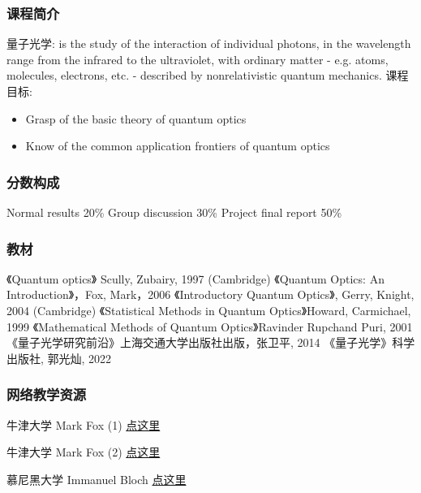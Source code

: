 \begin{frame}
    \frametitle{课程简介}
    \begin{enumerate}
        \Item 量子光学: is the study of the interaction of individual photons, in the wavelength range from the infrared to the ultraviolet, with ordinary matter - e.g. atoms, molecules, electrons, etc. - described by nonrelativistic quantum mechanics. 
        \Item 课程目标:       
        \begin{itemize}
          \item Grasp of the basic theory of quantum optics
          \item Know of the common application frontiers of quantum optics
      \end{itemize}
    \end{enumerate}
\end{frame}

\begin{frame} 
  \frametitle{分数构成}
      \begin{enumerate}
          \Item Normal results 20\%
          \Item Group discussion 30\%
          \Item Project final report 50\%
      \end{enumerate}
\end{frame}

\begin{frame}
    \frametitle{教材}
      \begin{itemize}
          \Item 《Quantum optics》 Scully, Zubairy, 1997 (Cambridge)        
          \Item 《Quantum Optics: An Introduction》，Fox, Mark，2006
          \Item 《Introductory Quantum Optics》, Gerry, Knight, 2004 (Cambridge)
          \Item 《Statistical Methods in Quantum Optics》Howard, Carmichael, 1999 
          \Item 《Mathematical Methods of Quantum Optics》Ravinder Rupchand Puri, 2001
          \Item 《量子光学研究前沿》上海交通大学出版社出版，张卫平, 2014
          \Item 《量子光学》科学出版社, 郭光灿, 2022
      \end{itemize}
\end{frame}

\begin{frame} 
\frametitle{网络教学资源}

牛津大学 Mark Fox (1)
\href{https://www.bilibili.com/video/BV1PK4y1E79Z?t=3.2}{点这里}\\ {\vspace*{2.3em}}

牛津大学 Mark Fox (2)
\href{https://www.bilibili.com/video/BV1mb4y1j7mu/?spm_id_from=autoNext} {点这里} \\ {\vspace*{2.3em}}

慕尼黑大学 Immanuel Bloch
\href{https://www.bilibili.com/video/BV1Ky4y1W7C7?p=1} {点这里}
     
\end{frame}

